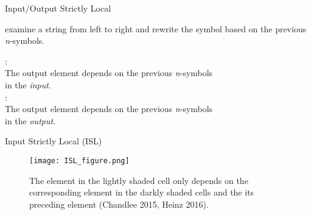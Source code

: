 \documentclass[professionalfonts, xcolor={usenames,svgnames,x11names,table}]{beamer}
\begin{document}
	\begin{frame}{Input/Output Strictly Local}

	\begin{block}{}
	 examine a string from left to right and rewrite the symbol based on the previous \textit{n}-symbols. 
	\end{block}
	\vspace{3mm}
	\indent {}: \\
	The output element depends on the previous \textit{n}-symbols \\ in the \textit{input}.\\
	\vspace{3mm}
	\indent {}: \\
	The output element depends on the previous \textit{n}-symbols \\ in the \textit{output}.	
	\end{frame}

	\begin{frame}{Input Strictly Local (ISL)}
		
	\begin{figure}[!hb]
		\centering
		\texttt{[image: ISL\_figure.png]} 
		\caption{The element in the lightly shaded cell only depends on the corresponding element in the darkly shaded cells and the its preceding element (Chandlee 2015, Heinz 2016).}
	\end{figure} 

	\end{frame}
	
\end{document}
